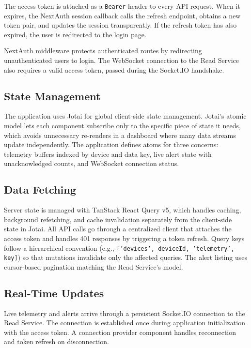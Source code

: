 The access token is attached as a \texttt{Bearer} header to every \gls{API} request. When it expires, the NextAuth session callback calls the refresh endpoint, obtains a new token pair, and updates the session transparently. If the refresh token has also expired, the user is redirected to the login page.

NextAuth middleware protects authenticated routes by redirecting unauthenticated users to login. The WebSocket connection to the Read Service also requires a valid access token, passed during the Socket.IO handshake.

\subsection{State Management}
\label{subsec:WebAppStateManagement}

The application uses Jotai for global client-side state management. Jotai's atomic model lets each component subscribe only to the specific piece of state it needs, which avoids unnecessary re-renders in a dashboard where many data streams update independently. The application defines atoms for three concerns: telemetry buffers indexed by device and data key, live alert state with unacknowledged counts, and WebSocket connection status.

\subsection{Data Fetching}
\label{subsec:WebAppDataFetching}

Server state is managed with TanStack React Query v5, which handles caching, background refetching, and cache invalidation separately from the client-side state in Jotai. All \gls{API} calls go through a centralized client that attaches the access token and handles 401 responses by triggering a token refresh. Query keys follow a hierarchical convention (e.g., \texttt{['devices', deviceId, 'telemetry', key]}) so that mutations invalidate only the affected queries. The alert listing uses cursor-based pagination matching the Read Service's model.

\subsection{Real-Time Updates}
\label{subsec:WebAppRealTime}

Live telemetry and alerts arrive through a persistent Socket.IO connection to the Read Service. The connection is established once during application initialization with the access token. A connection provider component handles reconnection and token refresh on disconnection.

